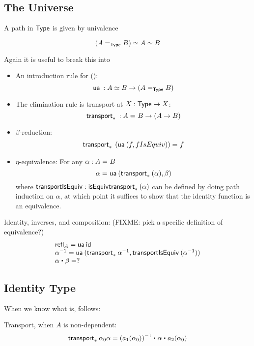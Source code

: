 \subsection{The Universe}

A path in $\type$ is given by univalence

\[
\eqv{(\id[\type]{A}{B})}{\eqv A B}
\]

Again it is useful to break this into 

\newcommand\isequiv{\mathsf{isEquiv}}

\begin{itemize}
\item An introduction rule for {()}:
  \[
  \ua{} : {\eqv A B} \to (\id[\type]{A}{B})
  \]
\item The elimination rule is transport at $X:\type \mapsto X$:
  \[
  \transport{X \mapsto X}{} : \id{A}{B} \to (A \to B)
  \]
\item $\beta$-reduction: 
  \[
  \begin{array}{l}
  \id{\transport{X \mapsto X} \: (\ua {(f, fIsEquiv)})}{f}
  \end{array}
  \]
\item $\eta$-equivalence: For any $\alpha : \id A B$
  \[
  \id{\alpha}{\ua {(\transport{X \mapsto X}(\alpha) , \beta)}}
  \]
  where $\mathsf{transportIsEquiv} : \isequiv{\transport{X \mapsto X}(\alpha)}$ can be
  defined by doing path induction on $\alpha$, at which point it
  suffices to show that the identity function is an equivalence.  
\end{itemize}

Identity, inverses, and composition: (FIXME: pick a specific definition
of equivalence?)
\[
\begin{array}{l}
\refl{A} = \ua{\idfunc} \\
\opp{\alpha} = \ua {(\transport {X \mapsto X} {\opp \alpha}, \mathsf{transportIsEquiv} \: (\opp \alpha))} \\ 
{\alpha} \ct \beta = ? \\
\end{array}
\]

\subsection{Identity Type}

When we know what \id[A]{}{} is, \id[ {\id[A]{}{}} ]{}{} follows:

Transport, when $A$ is non-dependent:
\[
\begin{array}{l}
\transport{x_0:A_0 \mapsto \id[A] {a_1(x_0)}{a_2(x_0)}} {\alpha_0}{\alpha} = 
\opp{(\map{a_1}{\alpha_0})} \ct \alpha \ct \map{a_2}{\alpha_0}
\end{array}
\]

